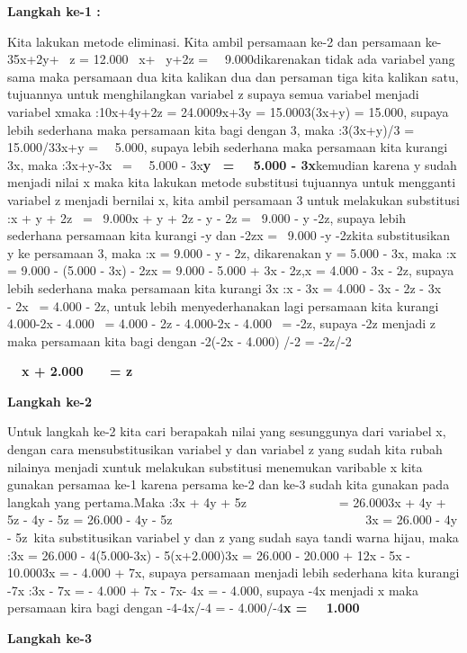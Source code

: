 \documentclass[11pt,fleqn]{book} %
\begin{document}
\noindent \textbf{Langkah ke-1 :}

\noindent Kita lakukan metode eliminasi. Kita ambil persamaan ke-2 dan persamaan ke-35x+2y+~ z = 12.000~ x+~ y+2z =~~ 9.000dikarenakan tidak ada variabel yang sama maka persamaan dua kita kalikan dua dan persaman tiga kita kalikan satu, tujuannya untuk menghilangkan variabel z supaya semua variabel menjadi variabel xmaka :10x+4y+2z = 24.0009x+3y = 15.0003(3x+y) = 15.000, supaya lebih sederhana maka persamaan kita bagi dengan 3, maka :3(3x+y)/3 = 15.000/33x+y =~~ 5.000, supaya lebih sederhana maka persamaan kita kurangi 3x, maka :3x+y-3x~ =~~ 5.000 - 3x\textbf{y~ =~~ 5.000 - 3x}kemudian karena y sudah menjadi nilai x maka kita lakukan metode substitusi tujuannya untuk mengganti variabel z menjadi bernilai x, kita ambil persamaan 3 untuk melakukan substitusi :x + y + 2z~ =~ 9.000x + y + 2z - y - 2z =~ 9.000 - y -2z, supaya lebih sederhana persamaan kita kurangi -y dan -2zx =~ 9.000 -y -2zkita substitusikan y ke persamaan 3, maka :x = 9.000 - y - 2z, dikarenakan y = 5.000 - 3x, maka :x = 9.000 - (5.000 - 3x) - 2zx = 9.000 - 5.000 + 3x - 2z,x = 4.000 - 3x - 2z, supaya lebih sederhana maka persamaan kita kurangi 3x :x - 3x = 4.000 - 3x - 2z - 3x~~ - 2x~ = 4.000 - 2z, untuk lebih menyederhanakan lagi persamaan kita kurangi~ 4.000-2x - 4.000~ = 4.000 - 2z - 4.000-2x - 4.000~ = -2z, supaya -2z menjadi z maka persamaan kita bagi dengan -2(-2x - 4.000) /-2 = -2z/-2

\noindent \textbf{~~x + 2.000~~~ = z}

\noindent \textbf{Langkah ke-2}

\noindent Untuk langkah ke-2 kita cari berapakah nilai yang sesunggunya dari variabel x, dengan cara mensubstitusikan variabel y dan variabel z yang sudah kita rubah nilainya menjadi xuntuk melakukan substitusi menemukan varibable x kita gunakan persamaa ke-1 karena persama ke-2 dan ke-3 sudah kita gunakan pada langkah yang pertama.Maka :3x + 4y + 5z~~~~~~~~~~~~~~ = 26.0003x + 4y + 5z - 4y - 5z = 26.000 - 4y - 5z~~~~~~~~~~~~~~~~~~~~~~~~~~~~~~ 3x = 26.000 - 4y - 5z~kita substitusikan variabel y dan z yang sudah saya tandi warna hijau, maka :3x = 26.000 - 4(5.000-3x) - 5(x+2.000)3x = 26.000 - 20.000 + 12x - 5x - 10.0003x = - 4.000 + 7x, supaya persamaan menjadi lebih sederhana kita kurangi -7x :3x - 7x = - 4.000 + 7x - 7x- 4x = - 4.000, supaya -4x menjadi x maka persamaan kira bagi dengan -4-4x/-4 = - 4.000/-4\textbf{x =~~ 1.000}

\noindent \textbf{Langkah ke-3}
\end{document}
